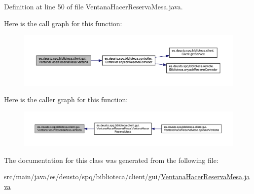 Definition at line 50 of file Ventana\+Hacer\+Reserva\+Mesa.\+java.

Here is the call graph for this function\+:
\nopagebreak
\begin{figure}[H]
\begin{center}
\leavevmode
\includegraphics[width=350pt]{classes_1_1deusto_1_1spq_1_1biblioteca_1_1client_1_1gui_1_1_ventana_hacer_reserva_mesa_a02e760f41c682169da251b802cf65181_cgraph}
\end{center}
\end{figure}
Here is the caller graph for this function\+:
\nopagebreak
\begin{figure}[H]
\begin{center}
\leavevmode
\includegraphics[width=350pt]{classes_1_1deusto_1_1spq_1_1biblioteca_1_1client_1_1gui_1_1_ventana_hacer_reserva_mesa_a02e760f41c682169da251b802cf65181_icgraph}
\end{center}
\end{figure}


The documentation for this class was generated from the following file\+:\begin{DoxyCompactItemize}
\item 
src/main/java/es/deusto/spq/biblioteca/client/gui/\mbox{\hyperlink{_ventana_hacer_reserva_mesa_8java}{Ventana\+Hacer\+Reserva\+Mesa.\+java}}\end{DoxyCompactItemize}
